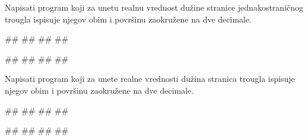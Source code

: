 \begin{Exercise}[label=p1.1_03a] 
Napisati program koji za unetu realnu vrednost dužine stranice jednakostraničnog trougla ispisuje njegov obim i površinu zaokružene na dve decimale. 

\begin{miditest}
\begin{upotreba}{1}
#\naslovInt#
##
##
##
\end{upotreba}
\end{miditest}
\begin{miditest}
\begin{upotreba}{2}
#\naslovInt#
##
##
##
\end{upotreba}
\end{miditest}
\end{Exercise}
\ifresenja
\begin{Answer}[ref=p1.1_03a]
\end{Answer}
\fi

\begin{Exercise}[label=p1.1_03] 
Napisati program koji za unete realne vrednosti dužina stranica trougla ispisuje njegov obim i površinu zaokružene na dve decimale. 

\begin{miditest}
\begin{upotreba}{1}
#\naslovInt#
##
##
##
\end{upotreba}
\end{miditest}
\begin{miditest}
\begin{upotreba}{2}
#\naslovInt#
##
##
##
\end{upotreba}
\end{miditest}
\end{Exercise}
\ifresenja
\begin{Answer}[ref=p1.1_03]
\end{Answer}
\fi


